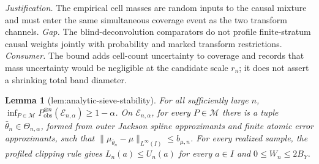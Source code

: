 \documentclass{article}
\newtheorem{lemma}{Lemma}
\begin{document}
\par\smallskip\noindent \textit{Justification.} The empirical cell masses are random inputs to the causal mixture and must enter the same simultaneous coverage event as the two transform channels. \textit{Gap.} The blind-deconvolution comparators do not profile finite-stratum causal weights jointly with probability and marked transform restrictions. \textit{Consumer.} The bound adds cell-count uncertainty to coverage and records that mass uncertainty would be negligible at the candidate scale \(r_n\); it does not assert a shrinking total band diameter.

\begin{lemma}[lem:analytic-sieve-stability]\label{lem:analytic-sieve-stability}
For all sufficiently large \(n\), \(\inf_{P\in\mathcal M}P_{\mathrm{obs}}^{\otimes n}(\mathcal E_{n,\alpha})\ge1-\alpha\). On \(\mathcal E_{n,\alpha}\), for every \(P\in\mathcal M\) there is a tuple \(\bar\theta_n\in\Theta_{n,\alpha}\), formed from outer Jackson spline approximants and finite atomic error approximants, such that \(\|\mu_{\bar\theta_n}-\mu\|_{L^\infty(I)}\le b_{\mu,n}\). For every realized sample, the profiled clipping rule gives \(L_n(a)\le U_n(a)\) for every \(a\in I\) and \(0\le W_n\le2B_Y\).
\end{lemma}
\end{document}
